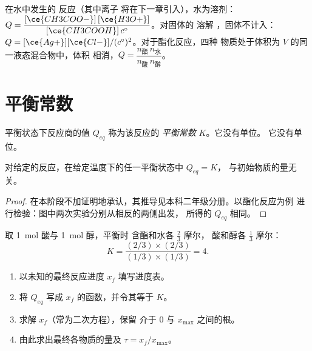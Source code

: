 \begin{example}[写出反应商]\label{ex:g12:equilibrium:quotients}
在水中发生的  反应（其中离子 
将在下一章引入），水为溶剂：
$Q = \dfrac{[\ce{CH3COO-}]\,[\ce{H3O+}]}{[\ce{CH3COOH}]\,c^\circ}$。对固体的
溶解 ，固体不计入：
$Q = [\ce{Ag+}][\ce{Cl-}]/(c^\circ)^2$。对于酯化反应，四种
物质处于体积为 $V$ 的同一液态混合物中，体积
相消，$Q = \dfrac{n_{\text{酯}}\, n_{\text{水}}}{n_{\text{酸}}\, n_{\text{醇}}}$。
\end{example}

\section{平衡常数}

\begin{definition}[平衡常数]\label{def:g12:equilibrium:constant}
平衡状态下反应商的值 $Q_{eq}$ 称为该反应的
\emph{平衡常数} $K$。它没有单位。
它没有单位。
\end{definition}

\begin{proposition}[$K$ 仅取决于温度]\label{prop:g12:equilibrium:constant}
对给定的反应，在给定温度下的任一平衡状态中 $Q_{eq} = K$，
与初始物质的量无关。
\end{proposition}

\begin{proof}
在本阶段不加证明地承认，其推导见本科二年级分册。以酯化反应为例
进行检验：图中两次实验分别从相反的两侧出发，
所得的 $Q_{eq}$ 相同。
\end{proof}

\begin{example}[酯化反应的 $K$]\label{ex:g12:equilibrium:k-ester}
取 \qty{1}{mol} 酸与 \qty{1}{mol} 醇，平衡时
含酯和水各 $\frac{2}{3}$ 摩尔，
酸和醇各 $\frac{1}{3}$ 摩尔：
\[
  K = \frac{(2/3)\times(2/3)}{(1/3)\times(1/3)} = 4 .
\]
\end{example}

\begin{method}[非完全反应的最终状态]\label{met:g12:equilibrium:final}
\begin{enumerate}
  \item 以未知的最终反应进度 $x_f$ 填写进度表。
  \item 将 $Q_{eq}$ 写成 $x_f$ 的函数，并令其等于 $K$。
  \item 求解 $x_f$（常为二次方程），保留
        介于 0 与 $x_{\max}$ 之间的根。
  \item 由此求出最终各物质的量及 $\tau = x_f/x_{\max}$。
\end{enumerate}
\end{method}

